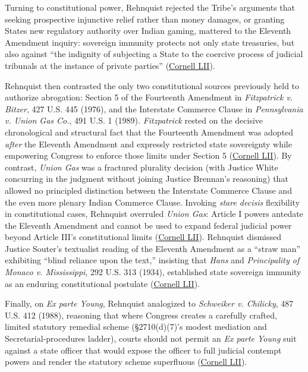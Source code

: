\documentclass[12pt]{article}
\begin{document}
Turning to constitutional power, Rehnquist rejected the Tribe's arguments that seeking prospective injunctive relief rather than money damages, or granting States new regulatory authority over Indian gaming, mattered to the Eleventh Amendment inquiry: sovereign immunity protects not only state treasuries, but also against ``the indignity of subjecting a State to the coercive process of judicial tribunals at the instance of private parties'' (\href{https://www.law.cornell.edu/supct/html/94-12.ZO.html}{Cornell LII}).

Rehnquist then contrasted the only two constitutional sources previously held to authorize abrogation: Section 5 of the Fourteenth Amendment in \textit{Fitzpatrick v. Bitzer}, 427 U.S. 445 (1976), and the Interstate Commerce Clause in \textit{Pennsylvania v. Union Gas Co.}, 491 U.S. 1 (1989). \textit{Fitzpatrick} rested on the decisive chronological and structural fact that the Fourteenth Amendment was adopted \textit{after} the Eleventh Amendment and expressly restricted state sovereignty while empowering Congress to enforce those limits under Section 5 (\href{https://www.law.cornell.edu/supct/html/94-12.ZO.html}{Cornell LII}). By contrast, \textit{Union Gas} was a fractured plurality decision (with Justice White concurring in the judgment without joining Justice Brennan's reasoning) that allowed no principled distinction between the Interstate Commerce Clause and the even more plenary Indian Commerce Clause. Invoking \textit{stare decisis} flexibility in constitutional cases, Rehnquist overruled \textit{Union Gas}: Article I powers antedate the Eleventh Amendment and cannot be used to expand federal judicial power beyond Article III's constitutional limits (\href{https://www.law.cornell.edu/supct/html/94-12.ZO.html}{Cornell LII}). Rehnquist dismissed Justice Souter's textualist reading of the Eleventh Amendment as a ``straw man'' exhibiting ``blind reliance upon the text,'' insisting that \textit{Hans} and \textit{Principality of Monaco v. Mississippi}, 292 U.S. 313 (1934), established state sovereign immunity as an enduring constitutional postulate (\href{https://www.law.cornell.edu/supct/html/94-12.ZO.html}{Cornell LII}).

Finally, on \textit{Ex parte Young}, Rehnquist analogized to \textit{Schweiker v. Chilicky}, 487 U.S. 412 (1988), reasoning that where Congress creates a carefully crafted, limited statutory remedial scheme (\S 2710(d)(7)'s modest mediation and Secretarial-procedures ladder), courts should not permit an \textit{Ex parte Young} suit against a state officer that would expose the officer to full judicial contempt powers and render the statutory scheme superfluous (\href{https://www.law.cornell.edu/supct/html/94-12.ZO.html}{Cornell LII}).
\end{document}
